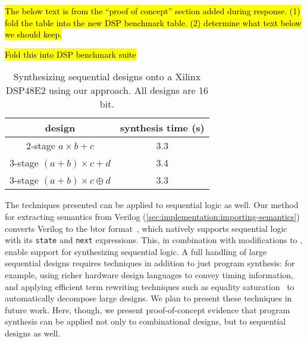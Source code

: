%    
%
%


\hl{
The below text is from the 
``proof of concept''
section added during response.
(1) fold the table into the new DSP benchmark 
table.
(2) determine what text below we should keep.
}

\begin{table}[]
\hl{Fold this into DSP benchmark suite}
    \normalsize
    \centering
    \caption{
Synthesizing sequential designs
  onto a Xilinx DSP48E2
  using our approach.
All designs are 16 bit.}
    \label{tab:sequential}
    \begin{tabular}{c|c}
\hline
design & synthesis time (s) \\
\hline
2-stage $a\times b + c$ &  3.3 \\
3-stage $(a + b) \times c + d$ &  3.4 \\
3-stage $(a + b) \times c \oplus d$ &  3.3 
    \end{tabular}
\end{table}
  
The techniques presented
  can be applied to sequential logic
  as well.
Our method for extracting semantics 
  from Verilog
  (\cref{sec:implementation:importing-semantics})
  converts Verilog to the btor format~\cite{btor},
  which natively supports
  sequential logic
  with its \texttt{state} and \texttt{next}
  expressions.
This, in combination with 
  modifications to \lrir,
  enable support for synthesizing
  sequential logic.
A full handling
  of large sequential designs
  requires techniques
  in addition to just program synthesis:
for example,
  using richer 
  hardware design languages
  to convey timing information, 
and
  applying efficient term rewriting
  techniques
  such as equality saturation~\cite{willsey2021egg}
  to automatically decompose large designs.
We plan to present these techniques
  in future work.
Here, though, we present
  proof-of-concept evidence
  that program synthesis
  can be applied not only
  to combinational designs,
  but to sequential designs as well.

